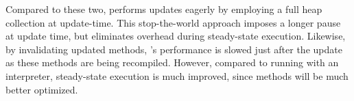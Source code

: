 Compared to these two, \DSU{} performs updates eagerly by employing a
full heap collection at update-time.  This stop-the-world approach imposes a longer pause at
update time, but eliminates overhead during steady-state execution.
Likewise, by invalidating updated methods, \DSU's performance is
slowed just after the update as these methods are being recompiled.
However, compared to running with an interpreter, steady-state
execution is much improved, since methods will be much better
optimized.





